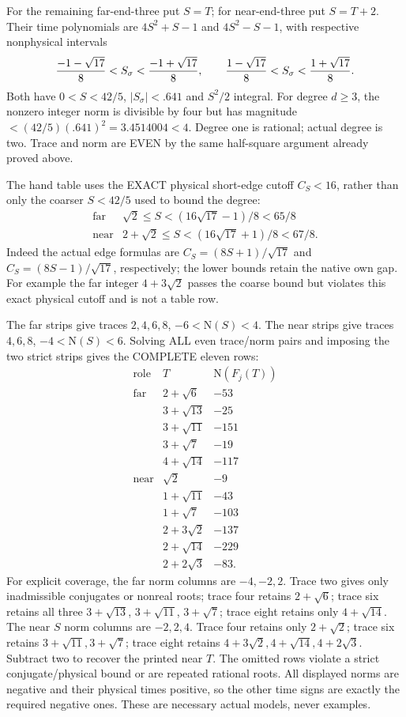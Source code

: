 \documentclass[11pt]{article}
\begin{document}
For the remaining far-end-three put \(S=T\);
for near-end-three put \(S=T+2\).
Their time polynomials are \(4S^2+S-1\) and
\(4S^2-S-1\), with respective nonphysical intervals
\[
 { -1-\sqrt{17}\over8}<S_\sigma<{ -1+\sqrt{17}\over8},
 \qquad
 {1-\sqrt{17}\over8}<S_\sigma<{1+\sqrt{17}\over8}.
\]
Both have \(0<S<42/5\), \(|S_\sigma|<.641\)
and \(S^2/2\) integral.
For degree \(d\ge3\), the nonzero integer norm
is divisible by four but has magnitude
\(<(42/5)(.641)^2=3.4514004<4\).
Degree one is rational; actual degree is two.
Trace and norm are EVEN by the same half-square
argument already proved above.

The hand table uses the EXACT physical short-edge
cutoff \(C_S<16\), rather than only the coarser
\(S<42/5\) used to bound the degree:
\[
\begin{array}{c|c}
 \text{far}&\sqrt2\le S<(16\sqrt{17}-1)/8<65/8\\
 \text{near}&2+\sqrt2\le S<(16\sqrt{17}+1)/8<67/8 .
\end{array}
\]
Indeed the actual edge formulas are
\(C_S=(8S+1)/\sqrt{17}\) and
\(C_S=(8S-1)/\sqrt{17}\), respectively;
the lower bounds retain the native own gap.
For example the far integer \(4+3\sqrt2\)
passes the coarse bound but violates this
exact physical cutoff and is not a table row.

The far strips give traces \(2,4,6,8\),
\(-6<\mathrm N(S)<4\).
The near strips give traces \(4,6,8\),
\(-4<\mathrm N(S)<6\).
Solving ALL even trace/norm pairs and imposing
the two strict strips gives the COMPLETE eleven rows:
\[
\begin{array}{c|c|r}
 \text{role}&T&\mathrm N(F_j(T))\\ \hline
 \text{far}&2+\sqrt6&-53\\
 &3+\sqrt{13}&-25\\
 &3+\sqrt{11}&-151\\
 &3+\sqrt7&-19\\
 &4+\sqrt{14}&-117\\ \hline
 \text{near}&\sqrt2&-9\\
 &1+\sqrt{11}&-43\\
 &1+\sqrt7&-103\\
 &2+3\sqrt2&-137\\
 &2+\sqrt{14}&-229\\
 &2+2\sqrt3&-83 .
\end{array}
\]
For explicit coverage, the far norm columns are
\(-4,-2,2\).
Trace two gives only inadmissible conjugates or
nonreal roots; trace four retains \(2+\sqrt6\);
trace six retains all three \(3+\sqrt{13}\),
\(3+\sqrt{11}\), \(3+\sqrt7\);
trace eight retains only \(4+\sqrt{14}\).
The near \(S\) norm columns are \(-2,2,4\).
Trace four retains only \(2+\sqrt2\);
trace six retains \(3+\sqrt{11},3+\sqrt7\);
trace eight retains \(4+3\sqrt2,4+\sqrt{14},4+2\sqrt3\).
Subtract two to recover the printed near \(T\).
The omitted rows violate a strict conjugate/physical
bound or are repeated rational roots.
All displayed norms are negative and their physical
times positive, so the other time signs are exactly
the required negative ones.
These are necessary actual models, never examples.
\end{document}
